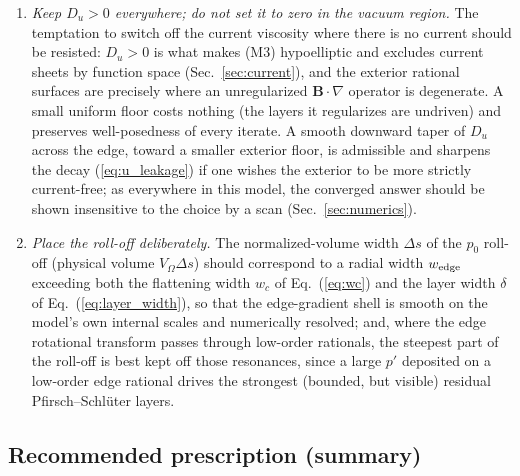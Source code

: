 \documentclass[english]{article}
\newcommand{\bB}{\mathbf{B}}
\begin{document}
\begin{enumerate}
region rather than decay in a thin layer (this is precisely the mechanism of
Sec.~\ref{sec:net_current} by which the regularization sets the mean current). It is the exterior
shell constraints $\Delta I_j=0$ that pin it, through $G$, to carry no net toroidal current; with a
smooth roll-off the required $G$ is essentially zero on the plateau, and the constraint is a
safeguard rather than an active correction. The exterior current is thus zero up to thin, bounded,
weakly driven layers hugging the plasma boundary. We therefore recommend imposing (M3b) on the
whole domain, including the exterior shells, rather than restricting the support of $G$ to the
plasma and relying on the exterior mean to decay by itself.
\item \emph{Keep $D_u>0$ everywhere; do not set it to zero in the vacuum region.} The temptation
to switch off the current viscosity where there is no current should be resisted: $D_u>0$ is what
makes (M3) hypoelliptic and excludes current sheets by function space
(Sec.~\ref{sec:current}), and the exterior rational surfaces are precisely where an unregularized
$\bB\cdot\nabla$ operator is degenerate. A small uniform floor costs nothing (the layers it
regularizes are undriven) and preserves well-posedness of every iterate. A smooth downward taper
of $D_u$ across the edge, toward a smaller exterior floor, is admissible and sharpens the decay
(\ref{eq:u_leakage}) if one wishes the exterior to be more strictly current-free; as everywhere in
this model, the converged answer should be shown insensitive to the choice by a scan
(Sec.~\ref{sec:numerics}).
\item \emph{Place the roll-off deliberately.} The normalized-volume width $\Delta s$ of the
$p_0$ roll-off (physical volume $V_\Omega\Delta s$) should correspond to a radial width
$w_{\rm edge}$ exceeding both the flattening
width $w_c$ of Eq.~(\ref{eq:wc}) and the layer width $\delta$ of Eq.~(\ref{eq:layer_width}), so
that the edge-gradient shell is smooth on the model's own internal scales and numerically
resolved; and, where the edge rotational transform passes through low-order rationals, the
steepest part of the roll-off is best kept off those resonances, since a large $p'$ deposited on a
low-order edge rational drives the strongest (bounded, but visible) residual
Pfirsch--Schl\"uter layers.
\end{enumerate}

\subsection{Recommended prescription (summary)}
\label{sec:edge_recipe}
\end{document}
